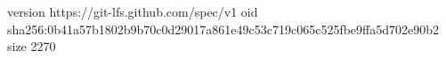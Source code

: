 version https://git-lfs.github.com/spec/v1
oid sha256:0b41a57b1802b9b70c0d29017a861e49c53c719c065c525fbe9ffa5d702e90b2
size 2270
